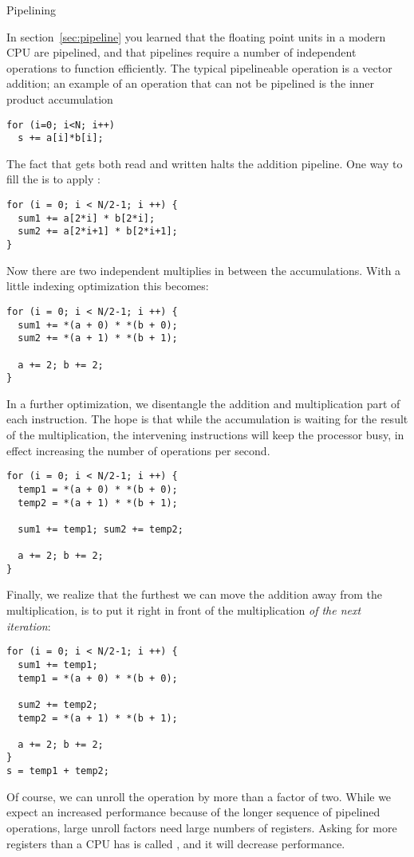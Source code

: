 
 {Pipelining}
\label{sec:coding-pipeline}

In section~\ref{sec:pipeline} you learned that the floating point
units in a modern CPU are pipelined, and that pipelines require a
number of independent operations to function efficiently. The typical
pipelineable operation is a vector addition; an example of an
operation that can not be pipelined is the inner product accumulation
\begin{lstlisting}
for (i=0; i<N; i++)
  s += a[i]*b[i];
\end{lstlisting}
The fact that  gets both read and written halts the addition
pipeline. One way to fill the 
is to apply :
\begin{lstlisting}
for (i = 0; i < N/2-1; i ++) {
  sum1 += a[2*i] * b[2*i];
  sum2 += a[2*i+1] * b[2*i+1];
}
\end{lstlisting}
Now there are two independent multiplies in between the accumulations.
With a little indexing optimization this becomes:
\begin{lstlisting}
for (i = 0; i < N/2-1; i ++) {
  sum1 += *(a + 0) * *(b + 0);
  sum2 += *(a + 1) * *(b + 1);

  a += 2; b += 2;
}
\end{lstlisting}

In a further optimization, we disentangle the addition and
multiplication part of each instruction. The hope is that while the
accumulation is waiting for the result of the multiplication, the
intervening instructions will keep the processor busy, in effect
increasing the number of operations per second.
\begin{lstlisting}
for (i = 0; i < N/2-1; i ++) {
  temp1 = *(a + 0) * *(b + 0);
  temp2 = *(a + 1) * *(b + 1);

  sum1 += temp1; sum2 += temp2;

  a += 2; b += 2;
}
\end{lstlisting}
Finally, we realize that the furthest we can move the addition away
from the multiplication, is to put it right in front of the
multiplication \emph{of the next iteration}:
\begin{lstlisting}
for (i = 0; i < N/2-1; i ++) {
  sum1 += temp1;
  temp1 = *(a + 0) * *(b + 0);

  sum2 += temp2;
  temp2 = *(a + 1) * *(b + 1);

  a += 2; b += 2;
}
s = temp1 + temp2;
\end{lstlisting}
Of course, we can unroll the operation by more than a factor of
two. While we expect an increased performance because of the longer
sequence of pipelined operations, large unroll factors
need large numbers of registers. Asking for more registers than a CPU
has is called , and it will decrease
performance.

